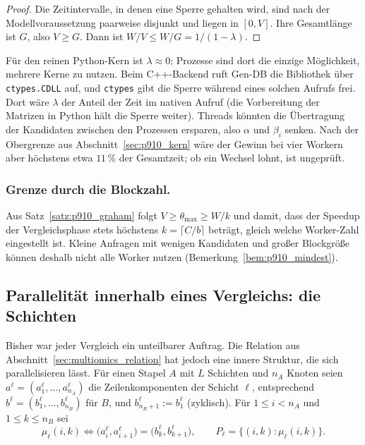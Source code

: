 \documentclass[a4paper,12pt, twoside]{report}
\theoremstyle{definition}
\begin{document}
\begin{proof}
Die Zeitintervalle, in denen eine Sperre gehalten wird, sind nach der Modellvoraussetzung paarweise disjunkt und liegen in $[0,V]$. Ihre Gesamtlänge ist $G$, also $V\ge G$. Dann ist $W/V\le W/G=1/(1-\lambda)$.
\end{proof}

Für den reinen Python-Kern ist $\lambda\approx 0$; Prozesse sind dort die einzige Möglichkeit, mehrere Kerne zu nutzen. Beim C++-Backend ruft Gen-DB die Bibliothek über \texttt{ctypes.CDLL} auf, und \texttt{ctypes} gibt die Sperre während eines solchen Aufrufs frei. Dort wäre $\lambda$ der Anteil der Zeit im nativen Aufruf (die Vorbereitung der Matrizen in Python hält die Sperre weiter). Threads könnten die Übertragung der Kandidaten zwischen den Prozessen ersparen, also $\alpha$ und $\beta_i$ senken. Nach der Obergrenze aus Abschnitt~\ref{sec:p910_kern} wäre der Gewinn bei vier Workern aber höchstens etwa $11\,\%$ der Gesamtzeit; ob ein Wechsel lohnt, ist ungeprüft.

\subsubsection{Grenze durch die Blockzahl.}
Aus Satz~\ref{satz:p910_graham} folgt $V\ge\theta_{\max}\ge W/k$ und damit, dass der Speedup der Vergleichsphase stets höchstens $k=\lceil C/b\rceil$ beträgt, gleich welche Worker-Zahl eingestellt ist. Kleine Anfragen mit wenigen Kandidaten und großer Blockgröße können deshalb nicht alle Worker nutzen (Bemerkung~\ref{bem:p910_mindest}).

\subsection{Parallelität innerhalb eines Vergleichs: die Schichten}
\label{sec:p910_schicht}

Bisher war jeder Vergleich ein unteilbarer Auftrag. Die Relation aus Abschnitt~\ref{sec:multiomics_relation} hat jedoch eine innere Struktur, die sich parallelisieren lässt. Für einen Stapel $A$ mit $L$ Schichten und $n_A$ Knoten seien $a^\ell=(a^\ell_1,\dots,a^\ell_{n_A})$ die Zeilenkomponenten der Schicht $\ell$, entsprechend $b^\ell=(b^\ell_1,\dots,b^\ell_{n_B})$ für $B$, und $b^\ell_{n_B+1}:=b^\ell_1$ (zyklisch). Für $1\le i<n_A$ und $1\le k\le n_B$ sei
\[
\mu_\ell(i,k)\iff\bigl(a^\ell_i,a^\ell_{i+1}\bigr)=\bigl(b^\ell_k,b^\ell_{k+1}\bigr),\qquad P_\ell=\{(i,k):\mu_\ell(i,k)\}.
\]
\end{document}
